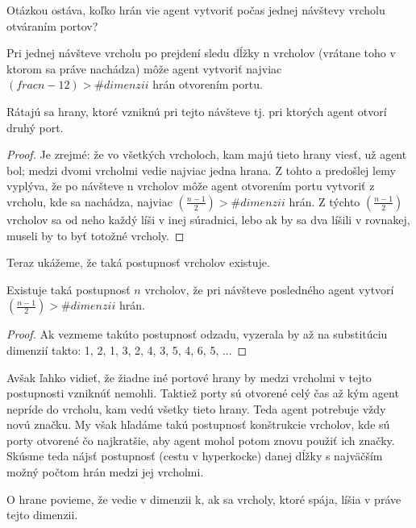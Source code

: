 Otázkou ostáva, koľko hrán vie agent vytvoriť počas jednej návštevy vrcholu
otváraním portov? 
\begin{lem}
Pri jednej návšteve vrcholu po prejdení sledu dĺžky n vrcholov (vrátane toho
v ktorom sa práve nachádza) môže agent vytvoriť najviac 
$(frac{n-1}{2}) > \#dimenzii$
hrán otvorením portu.
\end{lem}
\begin{pozn}
Rátajú sa hrany, ktoré vzniknú pri tejto návšteve tj. pri ktorých 
agent otvorí druhý port.
\end{pozn}
\begin{proof}
Je zrejmé: že vo všetkých vrcholoch, kam majú tieto hrany
viesť, už agent bol; medzi dvomi vrcholmi vedie najviac jedna hrana. Z tohto
a predošlej lemy vyplýva, že po návšteve n vrcholov môže agent otvorením
portu vytvoriť z vrcholu, kde sa nachádza, najviac $(\frac{n-1}{2}) > 
\#dimenzii$ hrán. Z
týchto $(\frac{n-1}{2})$ vrcholov sa od neho každý líši v inej súradnici,
lebo ak by sa dva líšili v rovnakej, museli by to byť totožné vrcholy. 
\end{proof}

Teraz ukážeme, že taká postupnosť vrcholov existuje.

\begin{lem}
Existuje taká postupnosť $n$ vrcholov, že pri návšteve posledného agent
vytvorí $(\frac{n-1}{2}) > \#dimenzii$ hrán.
\end{lem}
\begin{proof}
Ak vezmeme takúto postupnosť odzadu, vyzerala by až na substitúciu dimenzií
takto: 1, 2, 1, 3, 2, 4, 3, 5, 4, 6, 5, ...
\end{proof}

Avšak ľahko vidieť, že žiadne iné portové hrany by medzi vrcholmi v tejto
postupnosti vzniknúť nemohli. Taktiež porty sú otvorené celý čas až kým
agent nepríde do vrcholu, kam vedú všetky tieto hrany. Teda agent potrebuje
vždy novú značku. My však hľadáme takú postupnosť konštrukcie vrcholov, kde
sú porty otvorené čo najkratšie, aby agent mohol potom znovu použiť ich
značky.
Skúsme teda nájsť postupnosť (cestu v hyperkocke) danej dĺžky s najväčším 
možný počtom hrán medzi jej vrcholmi.
\begin{ozn}
O hrane povieme, že vedie v dimenzii k, ak sa vrcholy, ktoré spája, líšia v
práve tejto dimenzii. 
\end{ozn}

